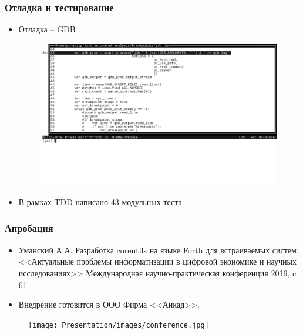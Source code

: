 \begin{frame}%
\frametitle{Отладка и тестирование {\ProgModule}}
    \begin{itemize}
        \item Отладка -- GDB
            \vspace{3ex}
            \begin{figure}[!htbp]
                \begin{adjustbox}{max totalsize={1.3\textwidth}{1.3\textheight}}
                    \includegraphics[trim={0 24ex 0 0 0},clip,width=\linewidth]{images/running-gdb.png}
                \end{adjustbox}
            \end{figure}
        \item В рамках TDD написано 43 модульных теста
    \end{itemize}

\end{frame}

\begin{frame}%
\frametitle{Апробация}
    \begin{itemize}
        \item Уманский А.А. Разработка coreutils на языке Forth для встраиваемых систем.
            <<Актуальные проблемы информатизации в цифровой экономике и научных исследованиях>>
            Международная научно-практическая конференция 2019, c 61.
        \item Внедрение {\ProgModule} готовится в ООО Фирма <<Анкад>>.
    \end{itemize}
    \begin{figure}[!htbp]
        \begin{adjustbox}{max totalsize={0.6\textwidth}{0.6\textheight}}
            \texttt{[image: Presentation/images/conference.jpg]}
        \end{adjustbox}
    \end{figure}
\end{frame}

